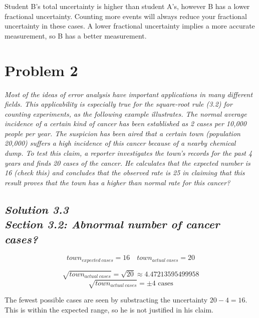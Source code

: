 \documentclass[a4paper, 12pt]{article}
\numberwithin{equation}{section}
\begin{document}
Student B's total uncertainty is higher than student A's, however B has a lower fractional uncertainty.
Counting more events will always reduce your fractional uncertainty in these cases.
A lower fractional uncertainty implies a more accurate measurement, so B has a better measurement.

\noindent\makebox[\linewidth]{\rule{\linewidth}{1pt}}
\section{Problem 2}
\emph{Most of the ideas of error analysis have important applications in many
different fields. This applicability is especially true for the square-root rule (3.2)
for counting experiments, as the following example illustrates. The normal average
incidence of a certain kind of cancer has been established as 2 cases per 10,000
people per year. The suspicion has been aired that a certain town (population
20,000) suffers a high incidence of this cancer because of a nearby chemical dump.
To test this claim, a reporter investigates the town's records for the past 4 years and
finds 20 cases of the cancer. He calculates that the expected number is 16 (check
this) and concludes that the observed rate is 25%
in claiming that this result proves that the town has a higher than normal rate for
this cancer?}\\

\subsection*{\emph{Solution 3.3\\Section 3.2: Abnormal number of cancer cases?}}

\begin{equation}
  town_{expected\:cases}= 16 \quad town_{actual\:cases} = 20
\end{equation}


\begin{equation}
\sqrt{town_{actual\:cases} } = \sqrt{20} \approx{4.47213595499958}
\end{equation}
\begin{equation}
\sqrt{town_{actual\:cases} } = \pm{4} \text{ cases}
\end{equation}

The fewest possible cases are seen by substracting the uncertainty
$20 - 4 = 16$.
This is within the expected range, so he is not justified in his claim.
\end{document}
